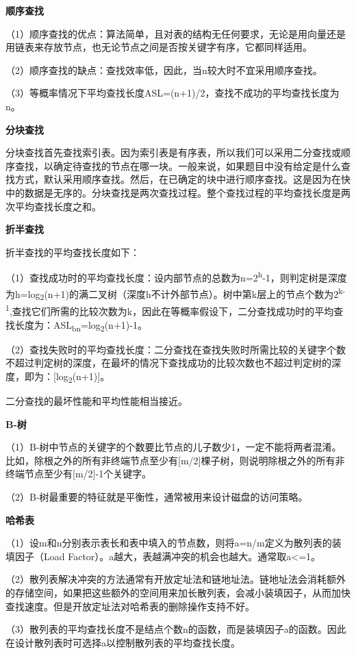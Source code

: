 \textbf{{顺序查找}}

（1）{顺序查找的优点：}算法简单，且对表的结构无任何要求，无论是用向量还是用链表来存放节点，也无论节点之间是否按关键字有序，它都同样适用。

（2）{顺序查找的缺点：}查找效率低，因此，当n较大时不宜采用顺序查找。

（3）等概率情况下平均查找长度ASL=(n+1)/2，查找不成功的平均查找长度为n。

\textbf{{分块查找}}

{分块查找首先查找索引表}{。}因为索引表是有序表，所以我们可以采用二分查找或顺序查找，以确定待查找的节点在哪一块。一般来说，如果题目中没有给定是什么查找方式，默认采用顺序查找。然后，在已确定的块中进行顺序查找。这是因为在快中的数据是无序的。{分块查找是两次查找过程}{。整个查找过程的平均查找长度是两次平均查找长度之和。}

\textbf{{折半查找}}

{折半查找的平均查找长度如下：}

（1）{查找成功时的平均查找长度：}设内部节点的总数为n=2\textsuperscript{h}-1，则判定树是深度为h=log\textsubscript{2}(n+1)的满二叉树（深度h不计外部节点）。树中第k层上的节点个数为2\textsuperscript{k-1},查找它们所需的比较次数为k，因此在等概率假设下，二分查找成功时的平均查找长度为：ASL\textsubscript{bn}=log\textsubscript{2}(n+1)-1。

（2）{查找失败时的平均查找长度：}二分查找在查找失败时所需比较的关键字个数不超过判定树的深度，在最坏的情况下查找成功的比较次数也不超过判定树的深度，即为：{[}log\textsubscript{2}(n+1){]}。

{二分查找的最坏性能和平均性能相当接近。}

\textbf{{B-树}}

（1）B-树中节点的{关键字的个数要比节点的儿子数少1}，一定不能将两者混淆。比如，除根之外的所有非终端节点至少有{[}m/2{]}棵子树，则说明除根之外的所有非终端节点至少有{[}m/2{]}-1个关键字。

（2）B-树最重要的特征就是平衡性，{通常被用来设计磁盘的访问策略}。

\textbf{{哈希表}}

（1）设m和n分别表示表长和表中填入的节点数，则将a=n/m定义为散列表的装填因子（Load
Factor）。a越大，表越满冲突的机会也越大。通常取a\textless{}=1。

（2）散列表解决冲突的方法通常有开放定址法和链地址法。{链地址法会消耗额外的存储空间}，如果把这些额外的空间用来加长散列表，会减小装填因子，从而加快查找速度。但是{开放定址法对哈希表的删除操作支持不好}。

（3）散列表的平均查找长度不是结点个数n的函数，而是装填因子a的函数。因此{在设计散列表时可选择a以控制散列表的平均查找长度。}
